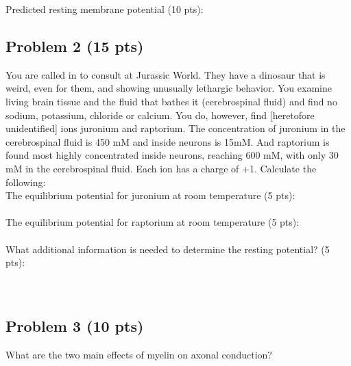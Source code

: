 \documentclass{article}
\begin{document}
Predicted resting membrane potential (10 pts):
\pagebreak{}
\subsection*{Problem 2 (15 pts)}
You are called in to consult at Jurassic World. They have a dinosaur that is weird, even for them, and showing unusually lethargic behavior. You examine living brain tissue and the fluid that bathes it (cerebrospinal fluid) and find no sodium, potassium, chloride or calcium. You do, however, find [heretofore unidentified] ions juronium and raptorium. The concentration of juronium in the cerebrospinal fluid is 450 mM and inside neurons is 15mM. And raptorium is found most highly concentrated inside neurons, reaching 600 mM, with only 30 mM in the cerebrospinal fluid. Each ion has a charge of +1. Calculate the following:\\

The equilibrium potential for juronium at room temperature (5 pts):\\\\

The equilibrium potential for raptorium at room temperature (5 pts):\\\\

What additional information is needed to determine the resting potential? (5 pts):\\\\\\

\subsection*{Problem 3 (10 pts)}
What are the two main effects of myelin on axonal conduction?\\\\
\pagebreak{}
\end{document}
